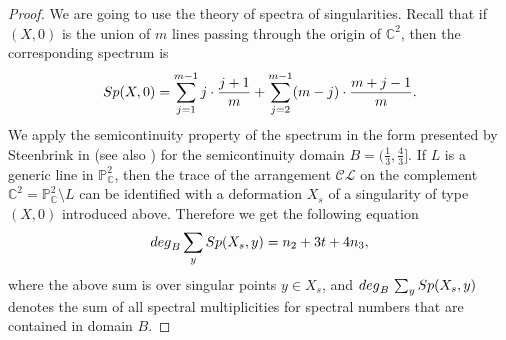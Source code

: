 \documentclass[12pt]{amsart}
\theoremstyle{plain}
\theoremstyle{definition}
\numberwithin{equation}{section}
\newcommand{\C}{\mathbb{C}}
\begin{document}
\begin{proof}
We are going to use the theory of spectra of singularities. Recall that  if $(X,0)$ is the union of $m$ lines passing through the origin of $\C^2$, then the corresponding spectrum is
$${\rm Sp}(X,0)= \sum_{j=1}^{m-1} j \cdot \frac{j+1}{m}  +\sum_{j=2}^{m-1}(m-j) \cdot \frac{m + j-1}{m} .$$
We apply the semicontinuity property of the spectrum in the form presented by Steenbrink in \cite{S} (see also \cite[Theorem 8.9.8]{Ku}) for the semicontinuity domain $B=(\frac{1}{3},\frac{4}{3}]$.
If $L$ is a generic line in $\mathbb{P}^{2}_{\mathbb{C}}$, then the trace of the arrangement  $\mathcal{CL}$ on the complement $\mathbb{C}^2=\mathbb{P}^{2}_{\mathbb{C}} \setminus L$ can be identified with a deformation $X_s$ of a singularity of type $(X,0)$ introduced above. Therefore we get the following equation
\begin{equation}
\label{E1}
{\rm deg}_B \sum_y {\rm Sp}(X_s, y) = n_2 + 3t + 4n_3,
\end{equation}
where the above sum is over singular points $y \in X_s$, and ${\rm deg}_{B} \, \sum_y {\rm Sp}(X_s , y)$ denotes the sum of all spectral multiplicities for spectral numbers that are contained in domain $B$.


\end{proof}
\end{document}
